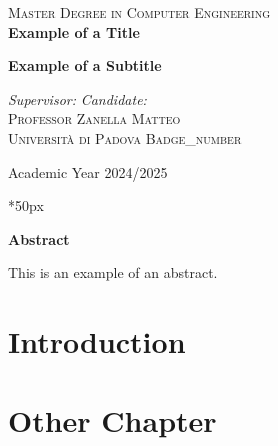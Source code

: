 \documentclass[a4paper,twoside,12pt]{report}
\newcommand\blankpage{%
    \null
    \thispagestyle{empty}%
    \addtocounter{page}{-1}%
    \newpage}
\begin{document}
\begin{titlepage}
\begin{center}
        \textsc{\large Master Degree in Computer Engineering}\\
        \vfill
        { \LARGE \bfseries Example of a Title}\\
        \vspace{1cm}

        \textbf{\large Example of a Subtitle}\\
        \vfill

        \textit{\large Supervisor:} \hfill \textit{\large Candidate:}\\
        \textsc{\large Professor} \hfill \textsc{Zanella Matteo}\\
        \textsc{Università di Padova} \hfill \textsc{Badge\_number}\\

        \vfill

        Academic Year 2024/2025

        \vfill

    \end{center}
\end{titlepage}

\thispagestyle{empty}
\clearpage{\pagestyle{plain}\cleardoublepage}
    
\clearpage\null\newpage

\newcommand\summaryname{Abstract}
\newenvironment{Abstract} {
    \begin{center}%
    \bfseries{\summaryname} \end{center}
}

\vspace*{50px}

\begin{Abstract}
This is an example of an abstract.
\end{Abstract}

\afterpage{\blankpage}

\clearpage{\pagestyle{plain}\cleardoublepage}
\tableofcontents

\clearpage{\pagestyle{plain}\cleardoublepage}

\clearpage{\pagestyle{plain}\cleardoublepage}
\chapter{Introduction}


\clearpage{\pagestyle{plain}\cleardoublepage}
\chapter{Other Chapter}


\afterpage{\blankpage}
    
\printbibliography
\end{document}
